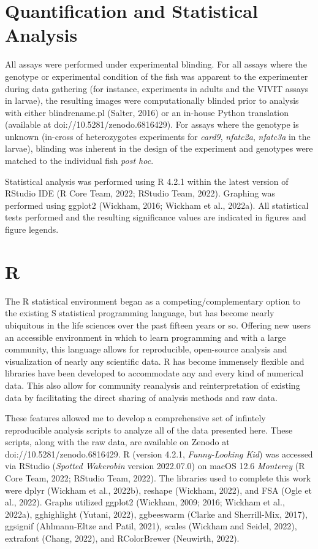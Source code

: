 \section{Quantification and Statistical Analysis}

All assays were performed under experimental blinding. For all assays where the genotype or experimental condition of the fish was apparent to the experimenter during data gathering (for instance, experiments in adults and the VIVIT assays in larvae), the resulting images were computationally blinded prior to analysis with either blindrename.pl (Salter, 2016) or an in-house Python translation (available at doi://10.5281/zenodo.6816429). For assays where the genotype is unknown (in-cross of heterozygotes experiments for \textit{card9}, \textit{nfatc2a}, \textit{nfatc3a} in the larvae), blinding was inherent in the design of the experiment and genotypes were matched to the individual fish \textit{post hoc}. 

Statistical analysis was performed using R 4.2.1 within the latest version of RStudio IDE (R Core Team, 2022; RStudio Team, 2022). Graphing was performed using ggplot2 (Wickham, 2016; Wickham et al., 2022a). All statistical tests performed and the resulting significance values are indicated in figures and figure legends.

\section{R}

The R statistical environment began as a competing/complementary option to the existing S statistical programming language, but has become nearly ubiquitous in the life sciences over the past fifteen years or so. Offering new users an accessible environment in which to learn programming and with a large community, this language allows for reproducible, open-source analysis and visualization of nearly any scientific data. R has become immensely flexible and libraries have been developed to accommodate any and every kind of numerical data. This also allow for community reanalysis and reinterpretation of existing data by facilitating the direct sharing of analysis methods and raw data. 

These features allowed me to develop a comprehensive set of infintely reproducible analysis scripts to analyze all of the data presented here. These scripts, along with the raw data, are available on Zenodo at doi://10.5281/zenodo.6816429. R (version 4.2.1, \textit{Funny-Looking Kid}) was accessed via RStudio (\textit{Spotted Wakerobin} version 2022.07.0) on macOS 12.6 \textit{Monterey} (R Core Team, 2022; RStudio Team, 2022). The libraries used to complete this work were dplyr (Wickham et al., 2022b), reshape (Wickham, 2022), and FSA (Ogle et al., 2022). Graphs utilized ggplot2 (Wickham, 2009; 2016; Wickham et al., 2022a), gghighlight (Yutani, 2022), ggbeeswarm (Clarke and Sherrill-Mix, 2017), ggsignif (Ahlmann-Eltze and Patil, 2021), scales (Wickham and Seidel, 2022), extrafont (Chang, 2022), and RColorBrewer (Neuwirth, 2022).

